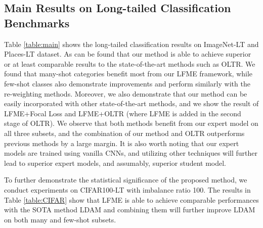 \documentclass[runningheads]{llncs}
\begin{document}
	
	


	
	\subsection{Main Results on Long-tailed Classification Benchmarks}
	Table \ref{table:main} shows the long-tailed classification results on ImageNet-LT and Places-LT dataset. As can be found that our method is able to achieve superior or at least comparable results to the state-of-the-art methods such as OLTR. We found that  many-shot categories benefit most from our LFME framework, while few-shot classes also demonstrate improvements and perform similarly with the re-weighting methods. Moreover, we also demonstrate that our method can be easily incorporated with other state-of-the-art methods, and we show the result of LFME+Focal Loss and LFME+OLTR (where LFME is added in the second stage of OLTR). We observe that both methods benefit from our expert model on all three subsets, and the combination of our method and OLTR outperforms previous methods by a large margin. 
	It is also worth noting that our expert models are trained using vanilla CNNs, and utilizing other techniques will further lead to superior expert models, and assumably, superior student model.


To further demonstrate the statistical significance of the proposed method, we conduct experiments on CIFAR100-LT with imbalance ratio 100. The results in Table \ref{table:CIFAR} show that LFME is able to achieve comparable performances with the SOTA method LDAM \cite{cao2019learning} and combining them will further improve LDAM on both many and few-shot subsets.
	
	
	
















	




	
	
\end{document}
